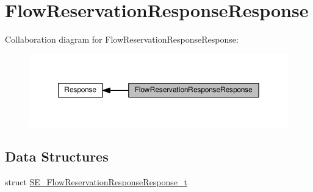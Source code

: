 \hypertarget{group__FlowReservationResponseResponse}{}\section{Flow\+Reservation\+Response\+Response}
\label{group__FlowReservationResponseResponse}
Collaboration diagram for Flow\+Reservation\+Response\+Response\+:\nopagebreak
\begin{figure}[H]
\begin{center}
\leavevmode
\includegraphics[width=350pt]{group__FlowReservationResponseResponse}
\end{center}
\end{figure}
\subsection*{Data Structures}
\begin{DoxyCompactItemize}
\item 
struct \hyperlink{structSE__FlowReservationResponseResponse__t}{S\+E\+\_\+\+Flow\+Reservation\+Response\+Response\+\_\+t}
\end{DoxyCompactItemize}
